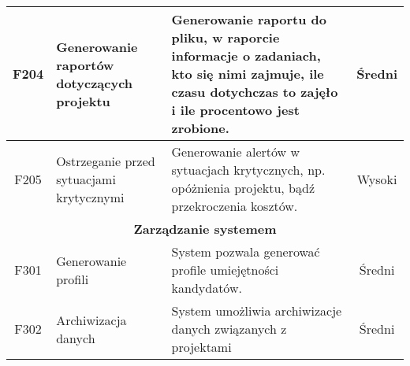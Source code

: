 \begin{tabularx}{\textwidth}{|c|X|X|c|}
\hline 
F204 & Generowanie raportów dotyczących projektu & Generowanie raportu do pliku, w raporcie informacje o zadaniach, kto się nimi zajmuje,  ile czasu dotychczas to zajęło i ile procentowo jest zrobione. & Średni \\
\hline 
F205 & Ostrzeganie przed sytuacjami krytycznymi & Generowanie alertów w sytuacjach krytycznych, np. opóżnienia projektu, bądź przekroczenia kosztów. & Wysoki \\
\hline 
\multicolumn{4}{|c|}{\textbf{Zarządzanie systemem}} \\
\hline 
F301 & Generowanie profili & System pozwala generować profile umiejętności kandydatów.  & Średni \\ 
\hline
F302 & Archiwizacja danych & System umożliwia archiwizacje danych związanych z projektami & Średni \\ 
\hline

\end{tabularx} 

